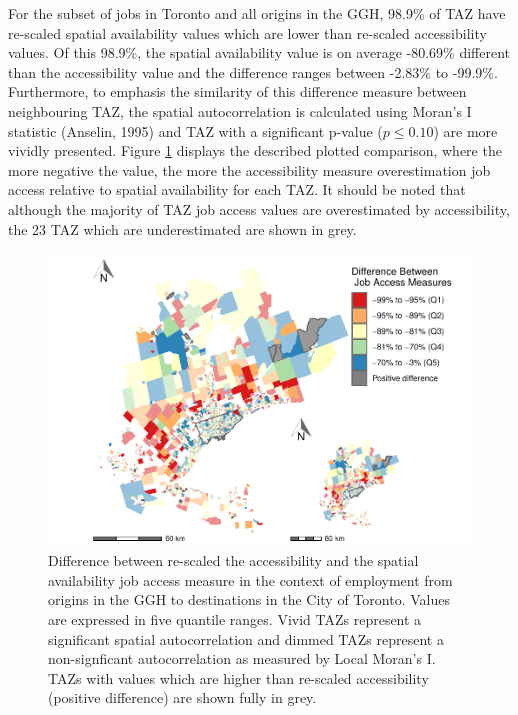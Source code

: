 \documentclass[]{elsarticle} %
\begin{document}
For the subset of jobs in Toronto and all origins in the GGH, 98.9\% of
TAZ have re-scaled spatial availability values which are lower than
re-scaled accessibility values. Of this 98.9\%, the spatial availability
value is on average -80.69\% different than the accessibility value and
the difference ranges between -2.83\% to -99.9\%. Furthermore, to
emphasis the similarity of this difference measure between neighbouring
TAZ, the spatial autocorrelation is calculated using Moran's I statistic
(Anselin, 1995) and TAZ with a significant p-value (\(p\le 0.10\)) are
more vividly presented. Figure \ref{fig:plot-local-i-Toronto} displays
the described plotted comparison, where the more negative the value, the
more the accessibility measure overestimation job access relative to
spatial availability for each TAZ. It should be noted that although the
majority of TAZ job access values are overestimated by accessibility,
the 23 TAZ which are underestimated are shown in grey.

\begin{figure}
\includegraphics[width=1\linewidth]{Spatial-Availability_files/figure-latex/plot-local-i-Toronto-1} \caption{\label{fig:plot-local-i-Toronto}Difference between re-scaled the accessibility and the spatial availability job access measure in the context of employment from origins in the GGH to destinations in the City of Toronto. Values are expressed in five quantile ranges. Vivid TAZs represent a significant spatial autocorrelation and dimmed TAZs represent a non-signficant autocorrelation as measured by Local Moran's I. TAZs with values which are higher than re-scaled accessibility (positive difference) are shown fully in grey.}\label{fig:plot-local-i-Toronto}
\end{figure}
\end{document}
